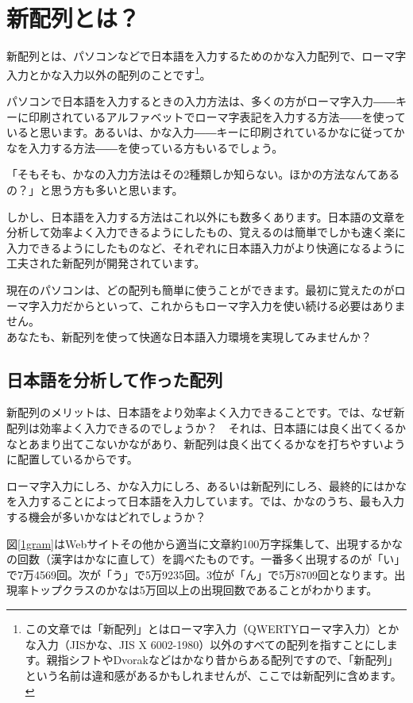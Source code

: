 
\section{新配列とは？}

新配列とは、パソコンなどで日本語を入力するためのかな入力配列で、ローマ字入力とかな入力以外の配列のことです\footnote{この文章では「新配列」とはローマ字入力（QWERTYローマ字入力）とかな入力（JISかな、JIS X 6002-1980）以外のすべての配列を指すことにします。親指シフトやDvorakなどはかなり昔からある配列ですので、「新配列」という名前は違和感があるかもしれませんが、ここでは新配列に含めます。}。

パソコンで日本語を入力するときの入力方法は、多くの方がローマ字入力――キーに印刷されているアルファベットでローマ字表記を入力する方法――を使っていると思います。あるいは、かな入力――キーに印刷されているかなに従ってかなを入力する方法――を使っている方もいるでしょう。

「そもそも、かなの入力方法はその2種類しか知らない。ほかの方法なんてあるの？」と思う方も多いと思います。

しかし、日本語を入力する方法はこれ以外にも数多くあります。日本語の文章を分析して効率よく入力できるようにしたもの、覚えるのは簡単でしかも速く楽に入力できるようにしたものなど、それぞれに日本語入力がより快適になるように工夫された新配列が開発されています。

現在のパソコンは、どの配列も簡単に使うことができます。最初に覚えたのがローマ字入力だからといって、これからもローマ字入力を使い続ける必要はありません。\\

あなたも、新配列を使って快適な日本語入力環境を実現してみませんか？

\subsection{日本語を分析して作った配列}

新配列のメリットは、日本語をより効率よく入力できることです。では、なぜ新配列は効率よく入力できるのでしょうか？　それは、日本語には良く出てくるかなとあまり出てこないかながあり、新配列は良く出てくるかなを打ちやすいように配置しているからです。

ローマ字入力にしろ、かな入力にしろ、あるいは新配列にしろ、最終的にはかなを入力することによって日本語を入力しています。では、かなのうち、最も入力する機会が多いかなはどれでしょうか？

図\ref{1gram}はWebサイトその他から適当に文章約100万字採集して、出現するかなの回数（漢字はかなに直して）を調べたものです。一番多く出現するのが「い」で7万4569回。次が「う」で5万9235回。3位が「ん」で5万8709回となります。出現率トップクラスのかなは5万回以上の出現回数であることがわかります。

